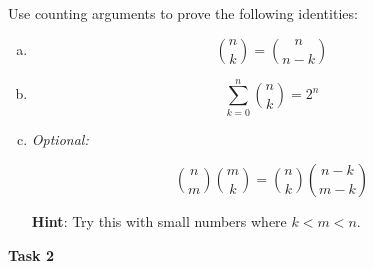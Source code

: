 \documentclass[12pt,letterpaper]{article}
\newcommand\hint[1]{\textbf{Hint}: #1}
\newenvironment{22enumerate}{\begin{enumerate}[a.]\itemsep0em}{\end{enumerate}}
\newif\ifsol
\newcommand{\solu}[2]{ \begin{mdframed} \ifsol #2 \else \vspace{#1} \fi \end{mdframed} }
\begin{document}
	Use counting arguments to prove the following identities:
	\begin{22enumerate}
	    \item $$\binom{n}{k} = \binom{n}{n - k}$$
	    \solu{4cm}{The LHS is the number of ways to choose $k$ elements from a set of size $n$, which can be equivalently seen as the number of ways to choose $n-k$ elements \emph{not} to include, which is what the RHS counts.}
	   
    	\item $$\sum_{k = 0}^{n} \binom{n}{k} = 2^n$$
        \solu{4cm}{The LHS is the number of subsets of each size of a set of size $n$ added together. In other words, we can count the number of subsets with 0 elements ($n \choose 0$), the number of subsets with 1 element ($n \choose 1)$), and so on. If we add them up, we will get $\sum_{k = 0}^{n} \binom{n}{k}$.
        
        Alternatively, the RHS is the total number of subsets of a size of size $n$. This is because, for each element, we can choose to either contain it in the subset, or not contain it in the subset. Thus, for each of the $n$ elements, we have $2$ options: include or don't include. That gives us $2 \cdot 2 \cdot ... \cdot 2 = 2^n$ different subsets.
        
        Thus, $\sum_{k = 0}^{n} \binom{n}{k} = 2^n$.}
        
        \item \textit{Optional: }
        
        $$\binom{n}{m}\binom{m}{k} = \binom{n}{k}\binom{n - k}{m - k}$$
        
        \hint{Try this with small numbers where $k < m < n$.}
        \solu{4cm}{The LHS is the number of ways to choose $m$ members of a general committee, and then choose $k$ special members from that $m$ for a subcommittee. The RHS is the number of ways to choose $k$ members of a special subcommittee, and then the number of ways to include the unpicked members in the general committee of size $m$, but it only has $m - k$ spots left.}
    \end{22enumerate}

\textbf{Task 2}
\end{document}
